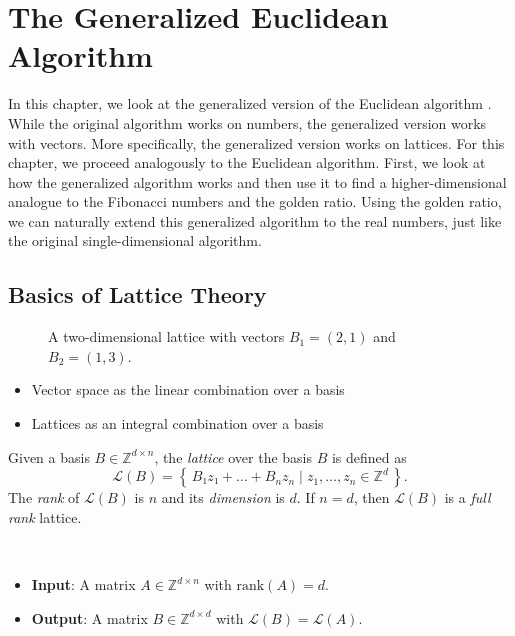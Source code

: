 \chapter{The Generalized Euclidean Algorithm}

In this chapter, we look at the generalized version of the Euclidean algorithm \cite{Klein24}.
While the original algorithm works on numbers,
the generalized version works with vectors.
More specifically, the generalized version works on lattices.
For this chapter, we proceed analogously to the Euclidean algorithm.
First, we look at how the generalized algorithm works and then use it to find a
higher-dimensional analogue to the Fibonacci numbers and the golden ratio.
Using the golden ratio, we can naturally extend this generalized algorithm to
the real numbers, just like the original single-dimensional algorithm.

\section{Basics of Lattice Theory}

\begin{figure}[b]
  \centering
  
  \caption{A two-dimensional lattice with vectors $B_1 = (2, 1)$ and $B_2 = (1, 3)$.}
\end{figure}

\begin{itemize}
  \item Vector space as the linear combination over a basis
  \item Lattices as an integral combination over a basis
\end{itemize}

\begin{definition}
  Given a basis $B ∈ ℤ^{d × n}$, the \emph{lattice} over the basis $B$ is defined as
  \[
    \mathcal{L}(B) = \left\{\, B₁z₁ + \dots + B_n z_n \mid z_1, \dots, z_n ∈ ℤ^d \,\right\}.
  \]
  The \emph{rank} of $\mathcal{L}(B)$ is $n$ and its \emph{dimension} is $d$.
  If $n = d$, then $\mathcal{L}(B)$ is a \emph{full rank} lattice.
\end{definition}

\begin{problem}~
  \begin{itemize}
    \item \textbf{Input}: A matrix $A ∈ ℤ^{d × n}$ with $\text{rank}(A) = d$.
    \item \textbf{Output}: A matrix $B ∈ ℤ^{d × d}$ with $\mathcal{L}(B) = \mathcal{L}(A)$.
  \end{itemize}
\end{problem}

